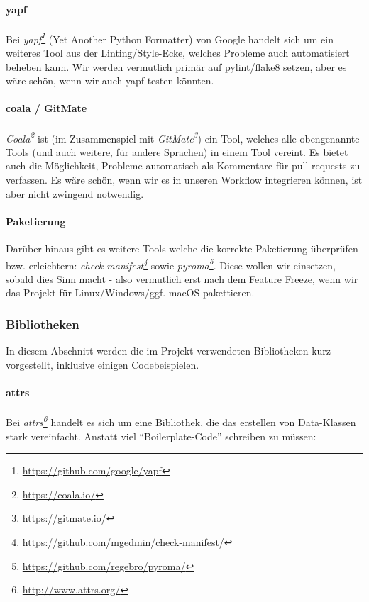 \documentclass[a4paper]{article}
\newcommand{\tool}[2]{\emph{#1\footnote{\url{#2}}}}
\begin{document}
\paragraph{yapf} Bei \tool{yapf}{https://github.com/google/yapf}
(Yet Another Python Formatter) von Google handelt sich um ein weiteres Tool aus
der Linting/Style-Ecke, welches Probleme auch automatisiert beheben kann. Wir
werden vermutlich primär auf pylint/flake8 setzen, aber es wäre schön, wenn wir
auch yapf testen könnten.

\paragraph{coala / GitMate} \tool{Coala}{https://coala.io/} ist
(im Zusammenspiel mit \tool{GitMate}{https://gitmate.io/}) ein
Tool, welches alle obengenannte Tools (und auch weitere, für andere Sprachen) in
einem Tool vereint. Es bietet auch die Möglichkeit, Probleme automatisch als
Kommentare für pull requests zu verfassen. Es wäre schön, wenn wir es in unseren
Workflow integrieren können, ist aber nicht zwingend notwendig.

\paragraph{Paketierung} Darüber hinaus gibt es weitere Tools welche die
korrekte Paketierung überprüfen bzw. erleichtern:
\tool{check-manifest}{https://github.com/mgedmin/check-manifest/}
sowie \tool{pyroma}{https://github.com/regebro/pyroma/}. Diese
wollen wir einsetzen, sobald dies Sinn macht - also vermutlich erst nach dem
Feature Freeze, wenn wir das Projekt für Linux/Windows/ggf. macOS pakettieren.

\subsubsection{Bibliotheken}

In diesem Abschnitt werden die im Projekt verwendeten Bibliotheken kurz
vorgestellt, inklusive einigen Codebeispielen.

\paragraph{attrs} Bei \tool{attrs}{http://www.attrs.org/} handelt es sich um eine Bibliothek, die das
erstellen von Data-Klassen stark vereinfacht. Anstatt viel ``Boilerplate-Code''
schreiben zu müssen:
\end{document}
